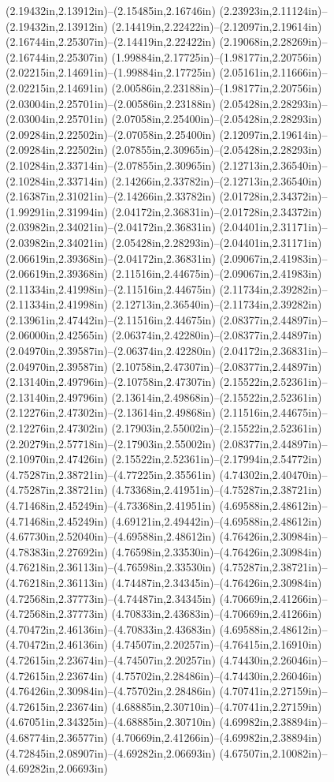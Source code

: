 (2.19432in,2.13912in)--(2.15485in,2.16746in) (2.23923in,2.11124in)--(2.19432in,2.13912in) (2.14419in,2.22422in)--(2.12097in,2.19614in) (2.16744in,2.25307in)--(2.14419in,2.22422in) (2.19068in,2.28269in)--(2.16744in,2.25307in) (1.99884in,2.17725in)--(1.98177in,2.20756in) (2.02215in,2.14691in)--(1.99884in,2.17725in) (2.05161in,2.11666in)--(2.02215in,2.14691in) (2.00586in,2.23188in)--(1.98177in,2.20756in) (2.03004in,2.25701in)--(2.00586in,2.23188in) (2.05428in,2.28293in)--(2.03004in,2.25701in) (2.07058in,2.25400in)--(2.05428in,2.28293in) (2.09284in,2.22502in)--(2.07058in,2.25400in) (2.12097in,2.19614in)--(2.09284in,2.22502in) (2.07855in,2.30965in)--(2.05428in,2.28293in) (2.10284in,2.33714in)--(2.07855in,2.30965in) (2.12713in,2.36540in)--(2.10284in,2.33714in) (2.14266in,2.33782in)--(2.12713in,2.36540in) (2.16387in,2.31021in)--(2.14266in,2.33782in) (2.01728in,2.34372in)--(1.99291in,2.31994in) (2.04172in,2.36831in)--(2.01728in,2.34372in) (2.03982in,2.34021in)--(2.04172in,2.36831in) (2.04401in,2.31171in)--(2.03982in,2.34021in) (2.05428in,2.28293in)--(2.04401in,2.31171in) (2.06619in,2.39368in)--(2.04172in,2.36831in) (2.09067in,2.41983in)--(2.06619in,2.39368in) (2.11516in,2.44675in)--(2.09067in,2.41983in) (2.11334in,2.41998in)--(2.11516in,2.44675in) (2.11734in,2.39282in)--(2.11334in,2.41998in) (2.12713in,2.36540in)--(2.11734in,2.39282in) (2.13961in,2.47442in)--(2.11516in,2.44675in) (2.08377in,2.44897in)--(2.06000in,2.42565in) (2.06374in,2.42280in)--(2.08377in,2.44897in) (2.04970in,2.39587in)--(2.06374in,2.42280in) (2.04172in,2.36831in)--(2.04970in,2.39587in) (2.10758in,2.47307in)--(2.08377in,2.44897in) (2.13140in,2.49796in)--(2.10758in,2.47307in) (2.15522in,2.52361in)--(2.13140in,2.49796in) (2.13614in,2.49868in)--(2.15522in,2.52361in) (2.12276in,2.47302in)--(2.13614in,2.49868in) (2.11516in,2.44675in)--(2.12276in,2.47302in) (2.17903in,2.55002in)--(2.15522in,2.52361in) (2.20279in,2.57718in)--(2.17903in,2.55002in) (2.08377in,2.44897in)--(2.10970in,2.47426in) (2.15522in,2.52361in)--(2.17994in,2.54772in) (4.75287in,2.38721in)--(4.77225in,2.35561in) (4.74302in,2.40470in)--(4.75287in,2.38721in) (4.73368in,2.41951in)--(4.75287in,2.38721in) (4.71468in,2.45249in)--(4.73368in,2.41951in) (4.69588in,2.48612in)--(4.71468in,2.45249in) (4.69121in,2.49442in)--(4.69588in,2.48612in) (4.67730in,2.52040in)--(4.69588in,2.48612in) (4.76426in,2.30984in)--(4.78383in,2.27692in) (4.76598in,2.33530in)--(4.76426in,2.30984in) (4.76218in,2.36113in)--(4.76598in,2.33530in) (4.75287in,2.38721in)--(4.76218in,2.36113in) (4.74487in,2.34345in)--(4.76426in,2.30984in) (4.72568in,2.37773in)--(4.74487in,2.34345in) (4.70669in,2.41266in)--(4.72568in,2.37773in) (4.70833in,2.43683in)--(4.70669in,2.41266in) (4.70472in,2.46136in)--(4.70833in,2.43683in) (4.69588in,2.48612in)--(4.70472in,2.46136in) (4.74507in,2.20257in)--(4.76415in,2.16910in) (4.72615in,2.23674in)--(4.74507in,2.20257in) (4.74430in,2.26046in)--(4.72615in,2.23674in) (4.75702in,2.28486in)--(4.74430in,2.26046in) (4.76426in,2.30984in)--(4.75702in,2.28486in) (4.70741in,2.27159in)--(4.72615in,2.23674in) (4.68885in,2.30710in)--(4.70741in,2.27159in) (4.67051in,2.34325in)--(4.68885in,2.30710in) (4.69982in,2.38894in)--(4.68774in,2.36577in) (4.70669in,2.41266in)--(4.69982in,2.38894in) (4.72845in,2.08907in)--(4.69282in,2.06693in) (4.67507in,2.10082in)--(4.69282in,2.06693in) 